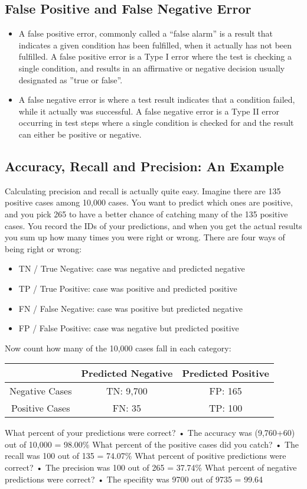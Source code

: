 \documentclass[a4paper,12pt]{article}
\begin{document}
\subsection*{False Positive and False Negative Error}

\begin{itemize}
	\item 
	A false positive error, commonly called a “false alarm” is a result that indicates
	a given condition has been fulfilled, when it actually has not been
	fulfilled. A false positive error is a Type I error where the test is checking
	a single condition, and results in an affirmative or negative decision usually
	designated as ”true or false”.
	\item  A false negative error is where a test result indicates that a condition
	failed, while it actually was successful. A false negative error is a Type II
	error occurring in test steps where a single condition is checked for and the
	result can either be positive or negative.
\end{itemize}



\subsection*{Accuracy, Recall and Precision: An Example}
Calculating precision and recall is actually quite easy. Imagine there are
135 positive cases among 10,000 cases. You want to predict which ones are
positive, and you pick 265 to have a better chance of catching many of the
135 positive cases. You record the IDs of your predictions, and when you
get the actual results you sum up how many times you were right or wrong.
There are four ways of being right or wrong:
\begin{itemize}
\item TN / True Negative: case was negative and predicted negative
\item TP / True Positive: case was positive and predicted positive
\item  FN / False Negative: case was positive but predicted negative
\item FP / False Positive: case was negative but predicted positive
\end{itemize}
Now count how many of the 10,000 cases fall in each category:
\begin{center}
\begin{tabular}{|c|c|c|}
  & Predicted Negative & Predicted Positive \\ \hline
Negative Cases & TN: 9,700 & FP: 165 \\ \hline
Positive Cases &  FN: 35 & TP: 100 \\ \hline
\end{tabular}
\end{center}
What percent of your predictions were correct?
• The accuracy was (9,760+60) out of 10,000 = 98.00\%
What percent of the positive cases did you catch?
• The recall was 100 out of 135 = 74.07\%
What percent of positive predictions were correct?
• The precision was 100 out of 265 = 37.74\%
What percent of negative predictions were correct?
• The specifity was 9700 out of 9735 = 99.64%
\end{document}
